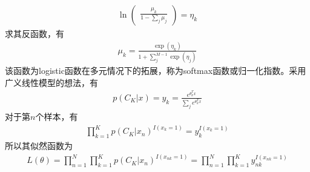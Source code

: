 \begin{eqnarray}
\ln
\left(
\begin{aligned}
\frac{\mu_k}{1-\sum_j\mu_j}
\end{aligned}
\right)
=\eta_k
\end{eqnarray}
求其反函数，有
\begin{eqnarray}
\mu_k=\frac{\exp(\eta_k)}{1+\sum_j^{M-1}\exp(\eta_j)}
\end{eqnarray}
该函数为logistic函数在多元情况下的拓展，称为softmax函数或归一化指数。采用广义线性模型的想法，有
\begin{eqnarray}
p(C_K|x)=y_k=\frac{e^{\theta_k^Tx}}{\sum_je^{\theta_k^Tx}}
\end{eqnarray}
对于第$n$个样本，有
\begin{eqnarray}
\prod_{k=1}^Kp(C_K|x_n)^{I(x_k=1)}=y_k^{I(x_k=1)}
\end{eqnarray}
所以其似然函数为
\begin{eqnarray}
L(\theta)= \prod_{n=1}^N\prod_{k=1}^Kp(C_K|x_n)^{I(x_{nk}=1)}=\prod_{n=1}^N\prod_{k=1}^Ky_{nk}^{I(x_{nk}=1)}
\end{eqnarray}